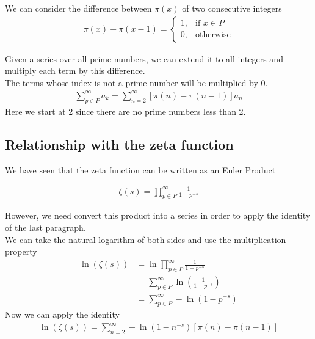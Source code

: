 \documentclass{article}
\begin{document}
We can consider the difference between \(\pi(x)\) of two consecutive integers
\begin{align*}
    \pi (x)-\pi (x-1)= 
    \begin{cases}
        1,& \text{if } x\in P
        \\
        0,& \text{otherwise}
    \end{cases}
\end{align*}

Given a series over all prime numbers, we can extend it to all integers and multiply each term by this difference.
\\
The terms whose index is not a prime number will be multiplied by 0.
\begin{align*}
    \sum_{p\in P}^{\infty}a_k=\sum_{n=2}^{\infty}\left[\pi(n)-\pi(n-1)\right]a_n
\end{align*}
Here we start at 2 since there are no prime numbers less than 2.

\subsection{Relationship with the zeta function}

We have seen that the zeta function can be written as an Euler Product

\begin{align*}
    \zeta (s)=\prod_{p\in P}^{\infty}\frac{1}{1-p^{-s}}
\end{align*}

However, we need convert this product into a series in order to apply the identity of the last paragraph.
\\
We can take the natural logarithm of both sides and use the multiplication property
\begin{align*}
    \ln\left(\zeta (s)\right)&=\ln\prod_{p\in P}^{\infty}\frac{1}{1-p^{-s}}
    \\
    &=\sum_{p\in P}^{\infty}\ln\left(\frac{1}{1-p^{-s}}\right)
    \\
    &=\sum_{p\in P}^{\infty}-\ln\left(1-p^{-s}\right)
\end{align*}
Now we can apply the identity
\begin{align*}
    \ln\left(\zeta (s)\right)=\sum_{n=2}^{\infty}-\ln\left(1-n^{-s}\right)\left[\pi (n) - \pi (n-1)\right]
\end{align*}
\end{document}
